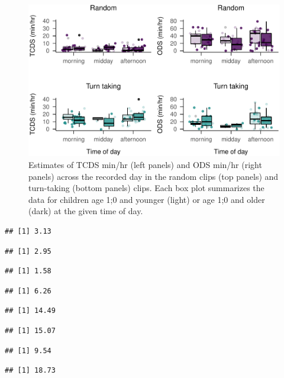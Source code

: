 \documentclass[,man,floatsintext]{apa6}
\begin{document}
\begin{figure}
\centering
\includegraphics{Yeli-CLE_files/figure-latex/fig5-1.pdf}
\caption{\label{fig:fig5}Estimates of TCDS min/hr (left panels) and ODS
min/hr (right panels) across the recorded day in the random clips (top
panels) and turn-taking (bottom panels) clips. Each box plot summarizes
the data for children age 1;0 and younger (light) or age 1;0 and older
(dark) at the given time of day.}
\end{figure}

\begin{verbatim}
## [1] 3.13
\end{verbatim}

\begin{verbatim}
## [1] 2.95
\end{verbatim}

\begin{verbatim}
## [1] 1.58
\end{verbatim}

\begin{verbatim}
## [1] 6.26
\end{verbatim}

\begin{verbatim}
## [1] 14.49
\end{verbatim}

\begin{verbatim}
## [1] 15.07
\end{verbatim}

\begin{verbatim}
## [1] 9.54
\end{verbatim}

\begin{verbatim}
## [1] 18.73
\end{verbatim}
\end{document}
